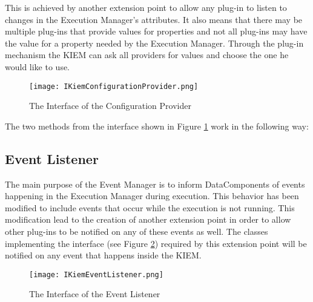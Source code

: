 This is achieved by another extension point to allow any plug-in to listen to changes
in the Execution Manager's attributes. It also means that there may be multiple
plug-ins that provide values for properties and not all plug-ins may have the value for
a property needed by the Execution Manager. Through the plug-in mechanism the \ac{KIEM}
can ask all providers for values and choose the one he would like to use.

\begin{figure}[Configuration Provider Interface]
  \centering
  \texttt{[image: IKiemConfigurationProvider.png]}
  \caption[The Interface of the Configuration Provider]%
  {The Interface of the Configuration Provider\protect\footnotemark}
  \label{fig:UMLConfigurationProvider}
\end{figure}

The two methods from the interface shown in Figure \ref{fig:UMLConfigurationProvider} work
in the following way:




\subsection{Event Listener}
\label{section:EventListener}
The main purpose of the Event Manager is to inform DataComponents of events
happening in the Execution Manager during execution. This behavior has been modified to include 
events that occur while the execution is not running. This modification lead to the 
creation of another extension point in order to allow other plug-ins to be notified
on any of these events as well. The classes implementing the interface 
(see Figure \ref{fig:UMLEventListener}) required by this extension point will be notified
on any event that happens inside the \ac{KIEM}.

\begin{figure}[Event Listener Interface]
  \centering
  \texttt{[image: IKiemEventListener.png]}
  \caption[The Interface of the Event Listener]%
  {The Interface of the Event Listener\protect\footnotemark}
  \label{fig:UMLEventListener}
\end{figure}

